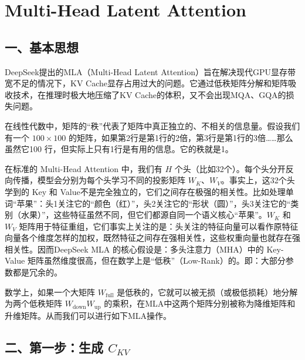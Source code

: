\setcounter{section}{4}

\hypertarget{multi-head-latent-attention}{%
\section{Multi-Head Latent Attention}\label{multi-head-latent-attention}}

\hypertarget{ux4e00ux57faux672cux601dux60f3-1}{%
\subsection{一、基本思想}\label{ux4e00ux57faux672cux601dux60f3-1}}

DeepSeek提出的MLA（Multi-Head Latent Attention）旨在解决现代GPU显存带宽不足的情况下，KV Cache显存占用过大的问题。它通过低秩矩阵分解和矩阵吸收技术，在推理时极大地压缩了KV Cache的体积，又不会出现MQA、GQA的损失问题。

在线性代数中，矩阵的``秩''代表了矩阵中真正独立的、不相关的信息量。假设我们有一个 \(100\times100\) 的矩阵，如果第2行是第1行的2倍，第3行是第1行的3倍\ldots\ldots 那么虽然它100 行，但实际上只有1行是有用的信息。它的秩就是1。

在标准的 Multi-Head Attention 中，我们有 \(H\) 个头（比如32个）。每个头分开反向传播，模型会分别为每个头学习不同的投影矩阵 \(W_K\)、\(W_V\)。事实上，这32个头学到的 Key 和 Value不是完全独立的，它们之间存在极强的相关性。比如处理单词``苹果''：头1关注它的``颜色（红）''，头2关注它的``形状（圆）''，头3关注它的``类别（水果）''，这些特征虽然不同，但它们都源自同一个语义核心``苹果''。\(W_K\) 和 \(W_V\) 矩阵用于特征重组，它们事实上关注的是：头关注的特征向量可以看作原特征向量各个维度怎样的加权，既然特征之间存在强相关性，这些权重向量也就存在强相关性。因而DeepSeek MLA 的核心假设是：多头注意力（MHA）中的 Key-Value 矩阵虽然维度很高，但在数学上是``低秩''（Low-Rank）的。即：大部分参数都是冗余的。

数学上，如果一个大矩阵 \(W_{\mathrm{full}}\) 是低秩的，它就可以被无损（或极低损耗）地分解为两个低秩矩阵 \(W_{\mathrm{down}}W_{\mathrm{up}}\) 的乘积，在MLA中这两个矩阵分别被称为降维矩阵和升维矩阵。从而我们可以进行如下MLA操作。

\hypertarget{ux4e8cux7b2cux4e00ux6b65ux751fux6210-c_kv}{%
\subsection{\texorpdfstring{二、第一步：生成 \(C_{KV}\)}{二、第一步：生成 C\_\{KV\}}}\label{ux4e8cux7b2cux4e00ux6b65ux751fux6210-c_kv}}

